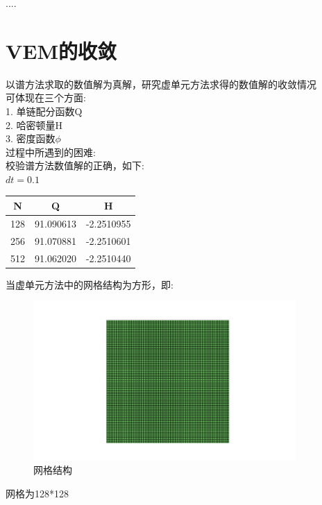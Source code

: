 \documentclass[12pt]{article}
\begin{document}
\begin{CJK}{UTF8}{gkai}
  ....\\
    \section{VEM的收敛}
    以谱方法求取的数值解为真解，研究虚单元方法求得的数值解的收敛情况\\
    
    可体现在三个方面:\\
    
    1. 单链配分函数Q\\
    
    2. 哈密顿量H\\
    
    3. 密度函数$\phi$ \\
    
    过程中所遇到的困难:\\
    
    校验谱方法数值解的正确，如下:\\
    
    $dt=0.1$\\
     \begin{table}[H]
     	\centering
     	\begin{tabular}{ccc}
     		
     		\toprule
     		N&Q & H \\
     		\midrule    
     		128&91.090613&-2.2510955\\
     		256&91.070881&-2.2510601\\
     		512&91.062020&-2.2510440\\
     		\bottomrule
     	\end{tabular}
     \end{table} 
    
     
    
    当虚单元方法中的网格结构为方形，即:\\
        \begin{figure}[H] 
        	\centering
        	\includegraphics[width=10cm]{vem.png}
        	\caption{网格结构}
        \end{figure}
        网格为128*128\\
        

\end{CJK}
\end{document}

